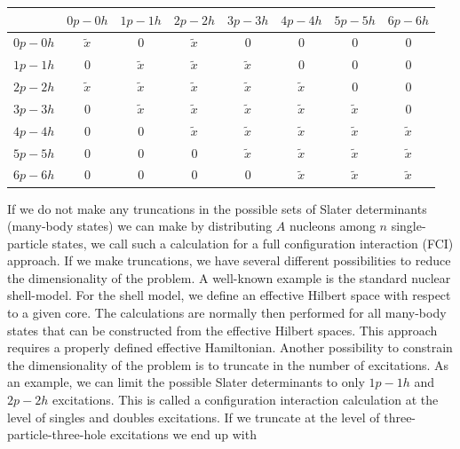   \begin{table}[h]
  \begin{center}
  \begin{tabular}{cccccccc}
  \hline \multicolumn{1}{c}{ } & \multicolumn{1}{c}{ $0p-0h$ } &
  \multicolumn{1}{c}{ $1p-1h$ } & \multicolumn{1}{c}{ $2p-2h$ } &
  \multicolumn{1}{c}{ $3p-3h$ } & \multicolumn{1}{c}{ $4p-4h$ } &
  \multicolumn{1}{c}{ $5p-5h$ } & \multicolumn{1}{c}{ $6p-6h$ }
  \\ \hline $0p-0h$ & $\tilde{x}$ & 0 & $\tilde{x}$ & 0 & 0 & 0 & 0
  \\ $1p-1h$ & 0 & $\tilde{x}$ & $\tilde{x}$ & $\tilde{x}$ & 0 & 0 & 0
  \\ $2p-2h$ & $\tilde{x}$ & $\tilde{x}$ & $\tilde{x}$ & $\tilde{x}$ &
  $\tilde{x}$ & 0 & 0 \\ $3p-3h$ & 0 & $\tilde{x}$ & $\tilde{x}$ &
  $\tilde{x}$ & $\tilde{x}$ & $\tilde{x}$ & 0 \\ $4p-4h$ & 0 & 0 &
  $\tilde{x}$ & $\tilde{x}$ & $\tilde{x}$ & $\tilde{x}$ & $\tilde{x}$
  \\ $5p-5h$ & 0 & 0 & 0 & $\tilde{x}$ & $\tilde{x}$ & $\tilde{x}$ &
  $\tilde{x}$ \\ $6p-6h$ & 0 & 0 & 0 & 0 & $\tilde{x}$ & $\tilde{x}$ &
  $\tilde{x}$ \\ \hline
  \end{tabular}
  \end{center}
  \end{table}
  If we do not make any truncations in the possible sets of Slater
  determinants (many-body states) we can make by distributing $A$
  nucleons among $n$ single-particle states, we call such a
  calculation for a full configuration interaction (FCI) approach.  If
  we make truncations, we have several different possibilities to
  reduce the dimensionality of the problem.  A well-known example is
  the standard nuclear shell-model. For the shell model, we define an
  effective Hilbert space with respect to a given core. The
  calculations are normally then performed for all many-body states
  that can be constructed from the effective Hilbert spaces. This
  approach requires a properly defined effective Hamiltonian.  Another
  possibility to constrain the dimensionality of the problem is to
  truncate in the number of excitations. As an example, we can limit
  the possible Slater determinants to only $1p-1h$ and $2p-2h$
  excitations. This is called a configuration interaction calculation
  at the level of singles and doubles excitations. If we truncate at
  the level of three-particle-three-hole excitations we end up with
